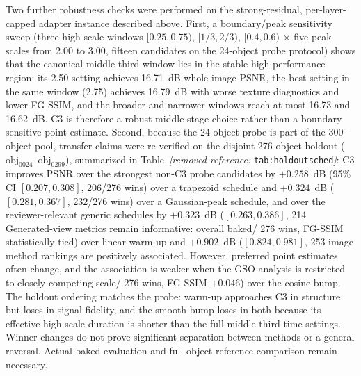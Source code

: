 \documentclass[times,twocolumn,final]{elsarticle}
\providecommand{\DIFadd}[1]{{\protect\color{blue} \sf #1}} %
\providecommand{\DIFdel}[1]{{\protect\color{red} \scriptsize #1}} %
\providecommand{\DIFaddbegin}{} %
\providecommand{\DIFaddend}{} %
\providecommand{\DIFdelbegin}{} %
\providecommand{\DIFdelend}{} %
\begin{document}
\DIFdelbegin \DIFdel{Two further robustness checks were performed on the strong-residual, per-layer-capped adapter instance described above. First, a boundary/peak sensitivity sweep (three high-scale windows $[0.25,0.75)$, $[1/3,2/3)$, $[0.4,0.6)$ $\times$ five peak scales from 2.00 to 3.00, fifteen candidates on the 24-object probe protocol) shows that the canonical middle-third window lies in the stable high-performance region: its 2.50 setting achieves 16.71~dB whole-image PSNR, the best setting in the same window (2.75) achieves 16.79~dB with worse texture diagnostics and lower FG-SSIM, and the broader and narrower windows reach at most 16.73 and 16.62~dB. C3 is therefore a robust middle-stage choice rather than a boundary-sensitive point estimate. Second, because the 24-object probe is part of the 300-object pool, transfer claims were re-verified on the disjoint 276-object holdout ($\mathrm{obj}_{0024}$--$\mathrm{obj}_{0299}$), summarized in Table~\textit{[removed reference: }\texttt{tab:holdoutsched}\textit{]}: C3 improves PSNR over the strongest non-C3 probe candidates by $+0.258$~dB (95\% CI $[0.207,0.308]$, 206/276 wins) over a trapezoid schedule and $+0.324$~dB ($[0.281,0.367]$, 232/276 wins) over a Gaussian-peak schedule, and over the reviewer-relevant generic schedules by $+0.323$~dB ($[0.263,0.386]$, 214}\DIFdelend \DIFaddbegin \DIFadd{Generated-view metrics remain informative: overall baked}\DIFaddend /\DIFdelbegin \DIFdel{276 wins, FG-SSIM statistically tied) over linear warm-up and $+0.902$~dB ($[0.824,0.981]$, 253}\DIFdelend \DIFaddbegin \DIFadd{image method rankings are positively associated. However, preferred point estimates often change, and the association is weaker when the GSO analysis is restricted to closely competing scale}\DIFaddend /\DIFdelbegin \DIFdel{276 wins, FG-SSIM $+0.046$) over the cosine bump. The holdout ordering matches the probe: warm-up approaches C3 in structure but loses in signal fidelity, and the smooth bump loses in both because its effective high-scale duration is shorter than the full middle third}\DIFdelend \DIFaddbegin \DIFadd{time settings. Winner changes do not prove significant separation between methods or a general reversal. Actual baked evaluation and full-object reference comparison remain necessary}\DIFaddend .
\end{document}
